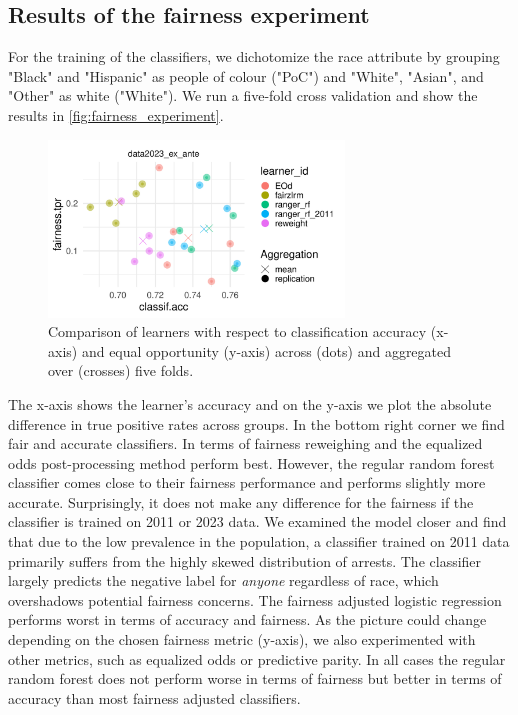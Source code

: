 \subsection{Results of the fairness experiment}
For the training of the classifiers, we dichotomize the race attribute by grouping "Black" and "Hispanic" as people of colour ("PoC") and "White", "Asian", and "Other" as white ("White"). We run a five-fold cross validation and show the results in \autoref{fig:fairness_experiment}.\par
\begin{figure}[ht]
    \centering
    \includegraphics[width=0.7\textwidth]{../figures/sqf_case_study_plot3.pdf}
    \caption{Comparison of learners with respect to classification accuracy (x-axis) and equal opportunity (y-axis) across (dots) and aggregated over (crosses) five folds.}
    \label{fig:fairness_experiment}
\end{figure}
The x-axis shows the learner's accuracy and on the y-axis we plot the absolute difference in true positive rates across groups. In the bottom right corner we find fair and accurate classifiers. In terms of fairness reweighing and the equalized odds post-processing method perform best. However, the regular random forest classifier comes close to their fairness performance and performs slightly more accurate. Surprisingly, it does not make any difference for the fairness if the classifier is trained on 2011 or 2023 data.
We examined the model closer and find that due to the low prevalence in the population, a classifier trained on 2011 data primarily suffers from the highly skewed distribution of arrests. The classifier largely predicts the negative label for \textit{anyone} regardless of race, which overshadows potential fairness concerns.
The fairness adjusted logistic regression performs worst in terms of accuracy and fairness.
As the picture could change depending on the chosen fairness metric (y-axis), we also experimented with other metrics, such as equalized odds or predictive parity. In all cases the regular random forest does not perform worse in terms of fairness but better in terms of accuracy than most fairness adjusted classifiers.




